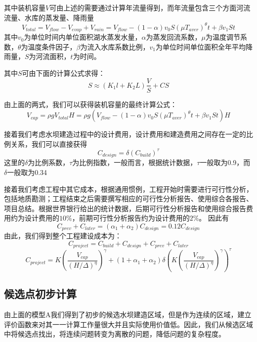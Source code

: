 \documentclass[nocover]{cumcmart}
\begin{document}
其中装机容量$V$可由上述的需要通过计算年流量得到，而年流量包含三个方面河流流量、水库的蒸发量、降雨量
\begin{equation}
V_{total} = V_{flow} - V_{evap} + V_{rain} = V_{flow} - (1-{\alpha})v_{0}S({\mu}T_{aver})^{\theta}t + {\beta}v_{1}St
\end{equation}
其中$v_{0}$为单位时间内单位面积湖水蒸发水量，$\alpha$为蒸发回流系数，$\mu$为温度调节系数，$\theta$为温度条件因子，$\beta$为流入水库系数比例，$v_{1}$为单位时间单位面积全年平均降雨量，$S$为河流面积，$t$为时间。

其中$S$可由下面的计算公式求得：
\begin{equation}
S \approx \left(K_{1}l + K_{2}L\right)\frac{V}{S} + CS
\end{equation}

由上面的两式，我们可以获得装机容量的最终计算公式：
\begin{equation}
V_{cap} = {\rho}gV_{total}H = {\rho}g(V_{flow} - (1 - {\alpha})v_{0}S({\mu}T_{aver})^{\theta}t + {\beta}v_{1}St)H
\end{equation}

接着我们考虑水坝建造过程中的设计费用，设计费用和建造费用之间存在一定的比例关系，我们可以直接获得
\begin{equation}
C_{design} = {\delta}(C_{build})^{\tau}
\end{equation}
这里的$\delta$为比例系数，$\tau$为比例指数，一般而言，根据统计数据，$\tau$一般取为0.9，而$\delta$一般取为0.34

接着我们考虑工程中其它成本，根据通用惯例，工程开始时需要进行可行性分析，包括地质勘测；工程结束之后需要撰写相应的可行性分析报告、使用综合各报告、项目总结。根据世界银行给出的统计数据，后期可行性分析报告和使用综合报告费用约为设计费用的$10\%$，前期可行性分析报告约为设计费用的$2\%$。
因此有
\begin{equation}
C_{prev} + C_{later}= (\alpha_{1} + \alpha_{2})C_{design} = 0.12C_{design}
\end{equation}
由此，我们得到整个工程建设成本为：
\begin{equation}
C_{project} = C_{build} + C_{design} + C_{prev} + C_{later}
\end{equation}
\begin{equation}
C_{project} = K(\frac{V_{cap}}{(H/\Delta)^{\eta}})^{\gamma} + (1+\alpha_{1}+\alpha_{2}){\delta}(K(\frac{V_{cap}}{(H/\Delta)^{\eta}})^{\gamma})^{\tau}
\end{equation}

\subsection{候选点初步计算}
由上面的模型A我们得到了初步的候选水坝建造区域，但是作为连续的区域，建立评价函数来对其一一计算工作量很大并且实际使用价值低。因此，我们从候选区域中将候选点找出，将连续问题转变为离散的问题，降低问题的复杂程度。
\end{document}
